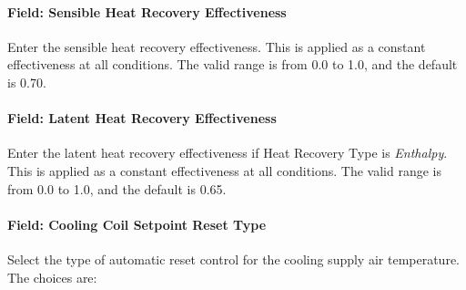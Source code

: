 \paragraph{Field: Sensible Heat Recovery Effectiveness}\label{field-sensible-heat-recovery-effectiveness-4}

Enter the sensible heat recovery effectiveness. This is applied as a constant effectiveness at all conditions. The valid range is from 0.0 to 1.0, and the default is 0.70.

\paragraph{Field: Latent Heat Recovery Effectiveness}\label{field-latent-heat-recovery-effectiveness-4}

Enter the latent heat recovery effectiveness if Heat Recovery Type is \emph{Enthalpy}. This is applied as a constant effectiveness at all conditions. The valid range is from 0.0 to 1.0, and the default is 0.65.

\paragraph{Field: Cooling Coil Setpoint Reset Type}\label{field-cooling-coil-setpoint-reset-type}

Select the type of automatic reset control for the cooling supply air temperature. The choices are:

